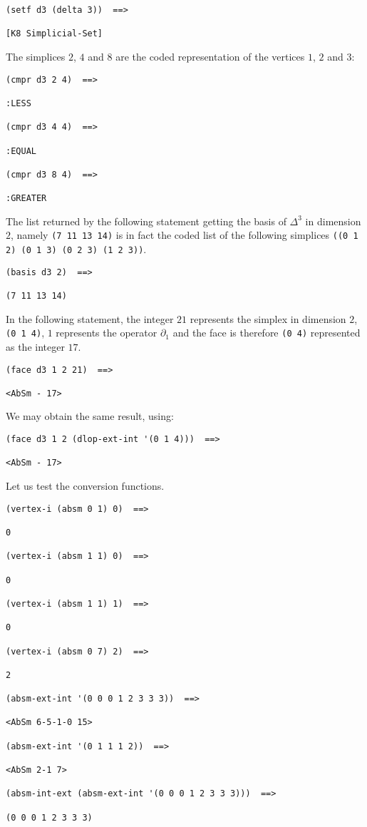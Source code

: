 {\footnotesize\begin{verbatim}
(setf d3 (delta 3))  ==>

[K8 Simplicial-Set]
\end{verbatim}}
The simplices $2$, $4$ and  $8$ are the coded representation of the vertices $1$, $2$ and $3$:
{\footnotesize\begin{verbatim}
(cmpr d3 2 4)  ==>

:LESS

(cmpr d3 4 4)  ==>

:EQUAL

(cmpr d3 8 4)  ==>

:GREATER
\end{verbatim}}
The list returned by the following statement  getting the basis of $\Delta^3$ in 
dimension $2$, namely {\tt (7 11 13 14)} is in fact the coded list 
of the following simplices {\tt ((0 1 2) (0 1 3) (0 2 3) (1 2 3))}. 
{\footnotesize\begin{verbatim}
(basis d3 2)  ==>

(7 11 13 14)
\end{verbatim}}
In the following statement, 
the integer $21$ represents the simplex in dimension $2$, {\tt (0 1 4)}, $1$ represents the operator $\partial_1$
and the face is therefore {\tt (0 4)} represented as the integer $17$. 
{\footnotesize\begin{verbatim}
(face d3 1 2 21)  ==>

<AbSm - 17>
\end{verbatim}}
We may obtain the same result, using:
{\footnotesize\begin{verbatim}
(face d3 1 2 (dlop-ext-int '(0 1 4)))  ==>

<AbSm - 17>
\end{verbatim}}
Let us test the conversion functions.
{\footnotesize\begin{verbatim}
(vertex-i (absm 0 1) 0)  ==>

0

(vertex-i (absm 1 1) 0)  ==>

0

(vertex-i (absm 1 1) 1)  ==>

0

(vertex-i (absm 0 7) 2)  ==>

2

(absm-ext-int '(0 0 0 1 2 3 3 3))  ==>

<AbSm 6-5-1-0 15>

(absm-ext-int '(0 1 1 1 2))  ==>

<AbSm 2-1 7>

(absm-int-ext (absm-ext-int '(0 0 0 1 2 3 3 3)))  ==>

(0 0 0 1 2 3 3 3)
\end{verbatim}}
